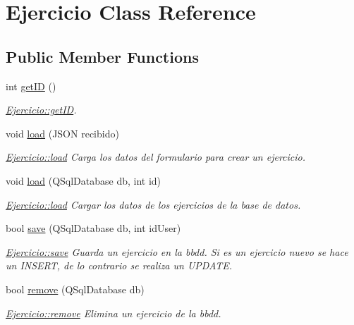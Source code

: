 \hypertarget{classEjercicio}{}\section{Ejercicio Class Reference}
\label{classEjercicio}
\subsection*{Public Member Functions}
\begin{DoxyCompactItemize}
\item 
int \mbox{\hyperlink{classEjercicio_a800393fb488a95c069f094a42d71b281}{get\+ID}} ()
\begin{DoxyCompactList}\small\item\em \mbox{\hyperlink{classEjercicio_a800393fb488a95c069f094a42d71b281}{Ejercicio\+::get\+ID}}. \end{DoxyCompactList}\item 
void \mbox{\hyperlink{classEjercicio_a82102164a1561e4990622c709969d94b}{load}} (J\+S\+ON recibido)
\begin{DoxyCompactList}\small\item\em \mbox{\hyperlink{classEjercicio_a82102164a1561e4990622c709969d94b}{Ejercicio\+::load}} Carga los datos del formulario para crear un ejercicio. \end{DoxyCompactList}\item 
void \mbox{\hyperlink{classEjercicio_ad0f313e73879f697532a73e6c70529ab}{load}} (Q\+Sql\+Database db, int id)
\begin{DoxyCompactList}\small\item\em \mbox{\hyperlink{classEjercicio_a82102164a1561e4990622c709969d94b}{Ejercicio\+::load}} Cargar los datos de los ejercicios de la base de datos. \end{DoxyCompactList}\item 
bool \mbox{\hyperlink{classEjercicio_a0012834d5116ad4f816e86854c8a54ef}{save}} (Q\+Sql\+Database db, int id\+User)
\begin{DoxyCompactList}\small\item\em \mbox{\hyperlink{classEjercicio_a0012834d5116ad4f816e86854c8a54ef}{Ejercicio\+::save}} Guarda un ejercicio en la bbdd. Si es un ejercicio nuevo se hace un I\+N\+S\+E\+RT, de lo contrario se realiza un U\+P\+D\+A\+TE. \end{DoxyCompactList}\item 
bool \mbox{\hyperlink{classEjercicio_a1d7547a6bb4ea39ec2bf6bd95d33b97d}{remove}} (Q\+Sql\+Database db)
\begin{DoxyCompactList}\small\item\em \mbox{\hyperlink{classEjercicio_a1d7547a6bb4ea39ec2bf6bd95d33b97d}{Ejercicio\+::remove}} Elimina un ejercicio de la bbdd. \end{DoxyCompactList}\item 

\end{DoxyCompactItemize}
